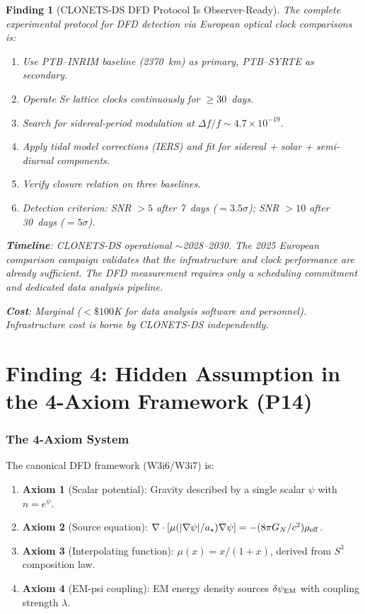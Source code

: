 \documentclass[11pt]{article}
\newtheorem{finding}{Finding}
\newcommand{\ee}[1]{\times 10^{#1}}
\newcommand{\dpsiEM}{\delta\psi_{\rm EM}}
\newcommand{\GN}{G_N}
\newcommand{\mufd}{\mu}
\begin{document}
\begin{finding}[CLONETS-DS DFD Protocol Is Observer-Ready]
\label{find:clonets-protocol}
The complete experimental protocol for DFD detection via European
optical clock comparisons is:
\begin{enumerate}[nosep]
\item Use PTB--INRIM baseline (2370~km) as primary, PTB--SYRTE as
  secondary.
\item Operate Sr lattice clocks continuously for $\geq 30$~days.
\item Search for sidereal-period modulation at $\Delta f/f \sim
  4.7\ee{-19}$.
\item Apply tidal model corrections (IERS) and fit for sidereal +
  solar + semi-diurnal components.
\item Verify closure relation on three baselines.
\item Detection criterion: SNR $> 5$ after 7~days ($= 3.5\sigma$);
  SNR $> 10$ after 30~days ($= 5\sigma$).
\end{enumerate}

\textbf{Timeline}: CLONETS-DS operational $\sim$2028--2030. The 2025
European comparison campaign validates that the infrastructure and
clock performance are already sufficient. The DFD measurement requires
only a scheduling commitment and dedicated data analysis pipeline.

\textbf{Cost}: Marginal ($< \$100$K for data analysis software and
personnel). Infrastructure cost is borne by CLONETS-DS independently.
\end{finding}


\part{Finding 4: Hidden Assumption in the 4-Axiom Framework (P14)}
\label{part:P14}

\section{The 4-Axiom System}

The canonical DFD framework (W3i6/W3i7) is:
\begin{enumerate}
\item \textbf{Axiom 1} (Scalar potential): Gravity described by a
  single scalar $\psi$ with $n = e^\psi$.
\item \textbf{Axiom 2} (Source equation): $\nabla\cdot[\mufd(|\nabla
  \psi|/a_\star)\nabla\psi] = -(8\pi\GN/c^2)\rho_{\rm eff}$.
\item \textbf{Axiom 3} (Interpolating function): $\mufd(x) = x/(1+x)$,
  derived from $S^3$ composition law.
\item \textbf{Axiom 4} (EM-psi coupling): EM energy density sources
  $\dpsiEM$ with coupling strength $\lambda$.
\end{enumerate}
\end{document}
